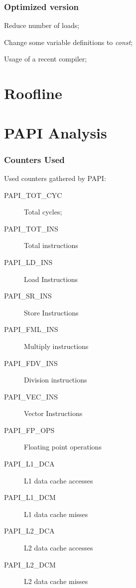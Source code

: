 \documentclass{beamer}
\begin{document}
\begin{frame}
	\frametitle{Optimized version}
	\begin{description}
		\item Reduce number of loads;
		\item Change some variable definitions to \emph{const};
		\item Usage of a recent compiler;
	\end{description} 
\end{frame}


\section{Roofline}
\begin{frame}
	\begin{figure}[!htp]
		\label{fig:roofline}
	\end{figure}
\end{frame}

\section{PAPI Analysis}
\begin{frame}
	\frametitle{Counters Used}

	Used counters gathered by PAPI:
	\begin{description}
		\item[PAPI\_TOT\_CYC] Total cycles;
		\item[PAPI\_TOT\_INS] Total instructions
		\item[PAPI\_LD\_INS] Load Instructions
		\item[PAPI\_SR\_INS] Store Instructions
		\item[PAPI\_FML\_INS] Multiply instructions
		\item[PAPI\_FDV\_INS] Division instructions
		\item[PAPI\_VEC\_INS] Vector Instructions
		\item[PAPI\_FP\_OPS] Floating point operations
		\item[PAPI\_L1\_DCA] L1 data cache accesses
		\item[PAPI\_L1\_DCM] L1 data cache misses
		\item[PAPI\_L2\_DCA] L2 data cache accesses
		\item[PAPI\_L2\_DCM] L2 data cache misses
	\end{description}
\end{frame}
\end{document}
